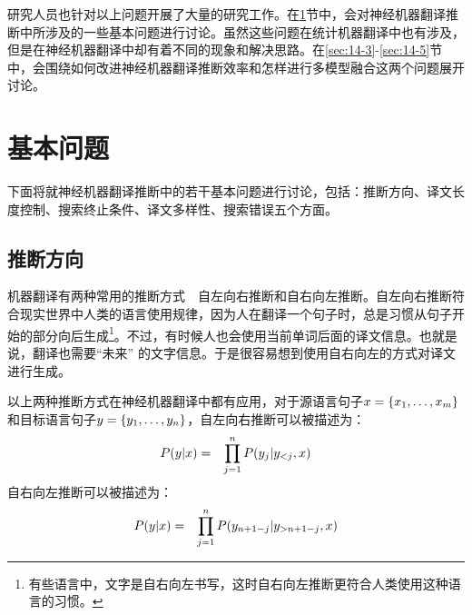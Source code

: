 \parinterval 研究人员也针对以上问题开展了大量的研究工作。在\ref{sec:14-2}节中，会对神经机器翻译推断中所涉及的一些基本问题进行讨论。虽然这些问题在统计机器翻译中也有涉及，但是在神经机器翻译中却有着不同的现象和解决思路。在\ref{sec:14-3}-\ref{sec:14-5}节中，会围绕如何改进神经机器翻译推断效率和怎样进行多模型融合这两个问题展开讨论。

\sectionnewpage
\section{基本问题}\label{sec:14-2}

\parinterval 下面将就神经机器翻译推断中的若干基本问题进行讨论，包括：推断方向、译文长度控制、搜索终止条件、译文多样性、搜索错误五个方面。


\subsection{推断方向}\label{sec:14-2-1}

\parinterval 机器翻译有两种常用的推断方式\ \dash \ 自左向右推断和自右向左推断。自左向右推断符合现实世界中人类的语言使用规律，因为人在翻译一个句子时，总是习惯从句子开始的部分向后生成\footnote{有些语言中，文字是自右向左书写，这时自右向左推断更符合人类使用这种语言的习惯。}。不过，有时候人也会使用当前单词后面的译文信息。也就是说，翻译也需要“未来” 的文字信息。于是很容易想到使用自右向左的方式对译文进行生成。

\parinterval 以上两种推断方式在神经机器翻译中都有应用，对于源语言句子${x}=\{x_1,\dots,x_m\}$和目标语言句子${y}=\{y_1,\dots,y_n\}$，自左向右推断可以被描述为：
\begin{eqnarray}
{P}({y}\vert{x}) &=& \prod_{j=1}^n {P}(y_j\vert{y}_{<j},{x})
\label{eq:14-1}
\end{eqnarray}
\parinterval 自右向左推断可以被描述为：
\begin{eqnarray}
{P}({y}\vert{x}) &=&\prod_{j=1}^n {P}(y_{n+1-j}\vert{y}_{>n+1-j},{x})
\label{eq:14-2}
\end{eqnarray}

